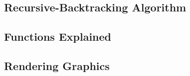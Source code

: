 \documentclass[11pt, margin=1in]{article}
\begin{document}
\subsection{Recursive-Backtracking Algorithm} %

\subsection{Functions Explained} %

\subsection{Rendering Graphics} %
\end{document}
